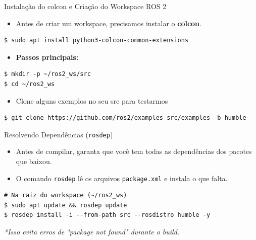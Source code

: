 \begin{frame}[fragile]{Instalação do colcon e Criação do Workspace ROS 2}
\begin{itemize}
  \item Antes de criar um workspace, precisamos instalar o \textbf{colcon}.
\end{itemize}

\begin{lstlisting}[style=bashstyle]
$ sudo apt install python3-colcon-common-extensions
\end{lstlisting}

\vspace{0.6em}
\begin{itemize}
  \item \textbf{Passos principais:}
\end{itemize}

\begin{lstlisting}[style=bashstyle]
$ mkdir -p ~/ros2_ws/src
$ cd ~/ros2_ws
\end{lstlisting}

\begin{itemize}
  \item Clone alguns exemplos no seu src para testarmos
\end{itemize}

\begin{lstlisting}[style=bashstyle]
$ git clone https://github.com/ros2/examples src/examples -b humble
\end{lstlisting}
\end{frame}

\begin{frame}[fragile]{Resolvendo Dependências (\texttt{rosdep})}
  \begin{itemize}
    \item Antes de compilar, garanta que você tem todas as dependências dos pacotes que baixou.
    \item O comando \texttt{rosdep} lê os arquivos \texttt{package.xml} e instala o que falta.
  \end{itemize}

\begin{lstlisting}[style=bashstyle]
# Na raiz do workspace (~/ros2_ws)
$ sudo apt update && rosdep update
$ rosdep install -i --from-path src --rosdistro humble -y
\end{lstlisting}
  \footnotesize{\textit{*Isso evita erros de "package not found" durante o build.}}
\end{frame}

